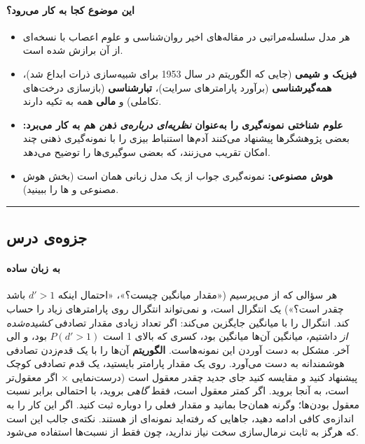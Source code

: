 \paragraph{این موضوع کجا به کار می‌رود؟}

\begin{itemize}
\tightlist
\item
  هر مدل سلسله‌مراتبی در مقاله‌های اخیر روان‌شناسی و علوم اعصاب با نسخه‌ای
  از آن برازش شده است.
\item
  \textbf{فیزیک و شیمی} (جایی که الگوریتم  در سال 1953
  برای شبیه‌سازی ذرات ابداع شد)، \textbf{همه‌گیرشناسی} (برآورد پارامترهای
  سرایت)، \textbf{تبارشناسی} (بازسازی درخت‌های تکاملی) و \textbf{مالی}
  همه به  تکیه دارند.
\item
  \textbf{علوم شناختی نمونه‌گیری را به‌عنوان \emph{نظریه‌ای درباره‌ی ذهن} هم
  به کار می‌برد:} بعضی پژوهشگرها پیشنهاد می‌کنند آدم‌ها استنباط بیزی را با
  نمونه‌گیری ذهنی چند امکان تقریب می‌زنند، که بعضی سوگیری‌ها را توضیح
  می‌دهد.
\item
  \textbf{هوش مصنوعی:} نمونه‌گیری جواب از یک مدل زبانی همان  است (بخش هوش مصنوعی و ها را ببینید).
\end{itemize}

\begin{center}\rule{0.5\linewidth}{0.5pt}\end{center}


\subsection{جزوه‌ی درس}

\paragraph{به زبان ساده}

هر سؤالی که از  می‌پرسیم («مقدار میانگین چیست؟»، «احتمال
اینکه \(d' > 1\) باشد چقدر است؟») یک انتگرال است، و  نمی‌تواند
انتگرال روی پارامترهای زیاد را حساب کند. \textbf{}
انتگرال را با میانگین جایگزین می‌کند: اگر تعداد زیادی مقدار تصادفی
\emph{کشیده‌شده از}  داشتیم، میانگین آن‌ها میانگین
 بود، کسری که بالای 1 است \(P(d' > 1)\) بود، و الی آخر.
مشکل به دست آوردن این نمونه‌هاست. \textbf{الگوریتم } آن‌ها
را با یک قدم‌زدن تصادفی هوشمندانه به دست می‌آورد. روی یک مقدار پارامتر
بایستید، یک قدم تصادفی کوچک پیشنهاد کنید و مقایسه کنید جای جدید چقدر
معقول است (درست‌نمایی ×  اگر معقول‌تر است، به آنجا بروید. اگر
کمتر معقول است، فقط \emph{گاهی} بروید، با احتمالی برابر نسبت معقول
بودن‌ها؛ وگرنه همان‌جا بمانید و مقدار فعلی را دوباره ثبت کنید. اگر این کار
را به اندازه‌ی کافی ادامه دهید، جاهایی که رفته‌اید نمونه‌ای از
 هستند. نکته‌ی جالب این است که هرگز به ثابت نرمال‌سازی سخت
نیاز ندارید، چون فقط از نسبت‌ها استفاده می‌شود.

